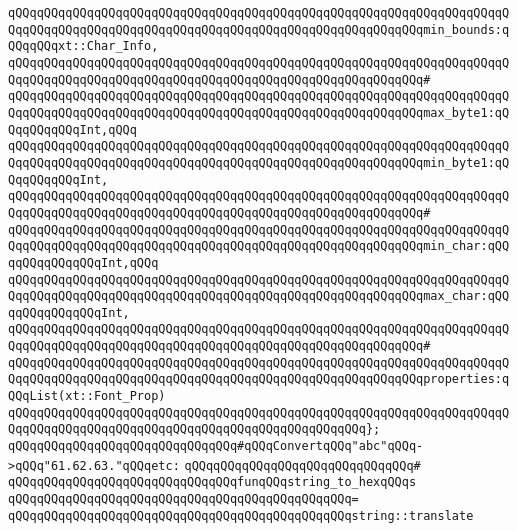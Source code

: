 \verb|qQQqqQQqqQQqqQQqqQQqqQQqqQQqqQQqqQQqqQQqqQQqqQQqqQQqqQQqqQQqqQQqqQQqqQQqqQQqqQQqqQQqqQQqqQQqqQQqqQQqqQQqqQQqqQQqqQQqqQQqqQQqqQQqmin_bounds:qQQqqQQqxt::Char_Info,|\newline
\verb|qQQqqQQqqQQqqQQqqQQqqQQqqQQqqQQqqQQqqQQqqQQqqQQqqQQqqQQqqQQqqQQqqQQqqQQqqQQqqQQqqQQqqQQqqQQqqQQqqQQqqQQqqQQqqQQqqQQqqQQqqQQqqQQq#|\newline
\verb|qQQqqQQqqQQqqQQqqQQqqQQqqQQqqQQqqQQqqQQqqQQqqQQqqQQqqQQqqQQqqQQqqQQqqQQqqQQqqQQqqQQqqQQqqQQqqQQqqQQqqQQqqQQqqQQqqQQqqQQqqQQqqQQqmax_byte1:qQQqqQQqqQQqInt,qQQq|\newline
\verb|qQQqqQQqqQQqqQQqqQQqqQQqqQQqqQQqqQQqqQQqqQQqqQQqqQQqqQQqqQQqqQQqqQQqqQQqqQQqqQQqqQQqqQQqqQQqqQQqqQQqqQQqqQQqqQQqqQQqqQQqqQQqqQQqmin_byte1:qQQqqQQqqQQqInt,|\newline
\verb|qQQqqQQqqQQqqQQqqQQqqQQqqQQqqQQqqQQqqQQqqQQqqQQqqQQqqQQqqQQqqQQqqQQqqQQqqQQqqQQqqQQqqQQqqQQqqQQqqQQqqQQqqQQqqQQqqQQqqQQqqQQqqQQq#|\newline
\verb|qQQqqQQqqQQqqQQqqQQqqQQqqQQqqQQqqQQqqQQqqQQqqQQqqQQqqQQqqQQqqQQqqQQqqQQqqQQqqQQqqQQqqQQqqQQqqQQqqQQqqQQqqQQqqQQqqQQqqQQqqQQqqQQqmin_char:qQQqqQQqqQQqqQQqInt,qQQq|\newline
\verb|qQQqqQQqqQQqqQQqqQQqqQQqqQQqqQQqqQQqqQQqqQQqqQQqqQQqqQQqqQQqqQQqqQQqqQQqqQQqqQQqqQQqqQQqqQQqqQQqqQQqqQQqqQQqqQQqqQQqqQQqqQQqqQQqmax_char:qQQqqQQqqQQqqQQqInt,|\newline
\verb|qQQqqQQqqQQqqQQqqQQqqQQqqQQqqQQqqQQqqQQqqQQqqQQqqQQqqQQqqQQqqQQqqQQqqQQqqQQqqQQqqQQqqQQqqQQqqQQqqQQqqQQqqQQqqQQqqQQqqQQqqQQqqQQq#|\newline
\verb|qQQqqQQqqQQqqQQqqQQqqQQqqQQqqQQqqQQqqQQqqQQqqQQqqQQqqQQqqQQqqQQqqQQqqQQqqQQqqQQqqQQqqQQqqQQqqQQqqQQqqQQqqQQqqQQqqQQqqQQqqQQqqQQqproperties:qQQqList(xt::Font_Prop)|\newline
\verb|qQQqqQQqqQQqqQQqqQQqqQQqqQQqqQQqqQQqqQQqqQQqqQQqqQQqqQQqqQQqqQQqqQQqqQQqqQQqqQQqqQQqqQQqqQQqqQQqqQQqqQQqqQQqqQQqqQQqqQQq};|\newline
\newline
\verb|qQQqqQQqqQQqqQQqqQQqqQQqqQQqqQQq#qQQqConvertqQQq"abc"qQQq->qQQq"61.62.63."qQQqetc:|\newline
\verb|qQQqqQQqqQQqqQQqqQQqqQQqqQQqqQQq#|\newline
\verb|qQQqqQQqqQQqqQQqqQQqqQQqqQQqqQQqfunqQQqstring_to_hexqQQqs|\newline
\verb|qQQqqQQqqQQqqQQqqQQqqQQqqQQqqQQqqQQqqQQqqQQqqQQq=|\newline
\verb|qQQqqQQqqQQqqQQqqQQqqQQqqQQqqQQqqQQqqQQqqQQqqQQqstring::translate|\newline
